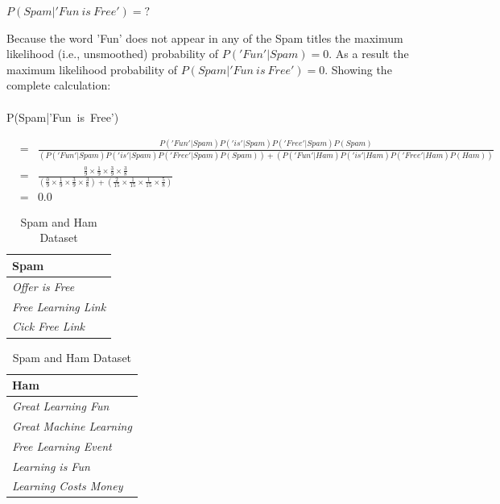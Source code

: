 \documentclass[--SOLUTION-OPTION--]{ditpaper}
\begin{document}
\begin{enumerate}
					\begin{center}
				$P(Spam|'Fun~is~Free')=?$
			\end{center}
			\begin{answer}
				Because the word 'Fun' does not appear in any of the Spam titles the maximum likelihood (i.e., unsmoothed) probability of $P('Fun'|Spam)=0$. As a result the maximum likelihood probability of $P(Spam|'Fun~is~Free')=0$. Showing the complete calculation: \\
				\\
				P(Spam|'Fun~is~Free')
				\begin{scriptsize}
				\begin{eqnarray*}
					&=& \frac{P('Fun'|Spam)P('is'|Spam)P('Free'|Spam)P(Spam)}{(P('Fun'|Spam)P('is'|Spam)P('Free'|Spam)P(Spam))+(P('Fun'|Ham)P('is'|Ham)P('Free'|Ham)P(Ham))}\\
					&=& \frac{\frac{0}{9} \times \frac{1}{9} \times \frac{3}{9} \times \frac{3}{8}}{(\frac{0}{9} \times \frac{1}{9} \times \frac{3}{9} \times \frac{3}{8})+(\frac{2}{15} \times \frac{1}{15} \times \frac{1}{15} \times \frac{5}{8})}\\
					&=& 0.0
				\end{eqnarray*}
				\end{scriptsize}
			\end{answer}
	\end{enumerate}

\newpage

\begin{table}[!htb]
    \caption{Spam and Ham Dataset}
    \begin{minipage}{.5\linewidth}
      \centering
\begin{tabular}{l}
\textbf{Spam}\\
\hline
\textit{Offer is Free}\\
\textit{Free Learning Link}\\
\textit{Cick Free Link}\\
\hline
\end{tabular}
    \end{minipage}%
    \begin{minipage}{.5\linewidth}
      \centering
\begin{tabular}{l}
\textbf{Ham}\\
\hline
\textit{Great Learning Fun}\\
\textit{Great Machine Learning}\\
\textit{Free Learning Event}\\
\textit{Learning is Fun}\\
\textit{Learning Costs Money}\\
\hline
\end{tabular}
    \end{minipage} 
    \label{tab:spamhamdata}
\end{table}
\end{document}
